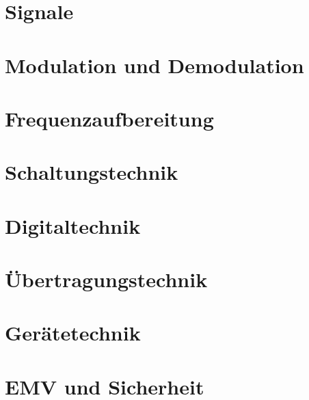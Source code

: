 \documentclass[ngerman,openany, oneside]{Script}
\begin{document}
\chapter{Signale}


\chapter{Modulation und Demodulation}


\chapter{Frequenzaufbereitung}


\chapter{Schaltungstechnik}


\chapter{Digitaltechnik}


\chapter{Übertragungstechnik}


\chapter{Gerätetechnik}


\chapter{EMV und Sicherheit}



\end{document}
